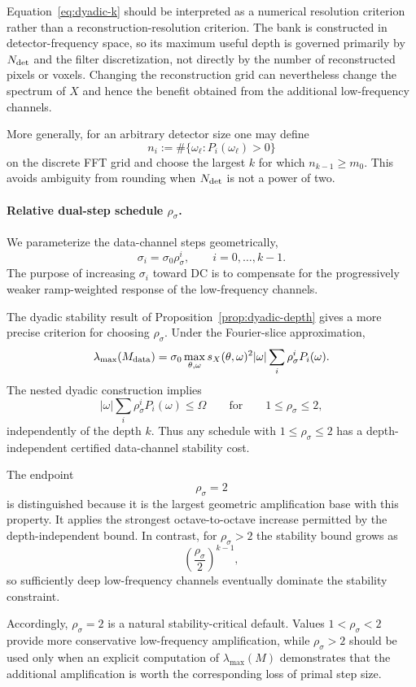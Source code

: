 \documentclass{article}
\begin{document}
Equation~\eqref{eq:dyadic-k} should be interpreted as a numerical
resolution criterion rather than a reconstruction-resolution
criterion.  The bank is constructed in detector-frequency space, so
its maximum useful depth is governed primarily by $N_{\rm det}$ and
the filter discretization, not directly by the number of reconstructed
pixels or voxels.  Changing the reconstruction grid can nevertheless
change the spectrum of $X$ and hence the benefit obtained from the
additional low-frequency channels.

More generally, for an arbitrary detector size one may define
\[
n_i
:=
\#\{\omega_\ell:P_i(\omega_\ell)>0\}
\]
on the discrete FFT grid and choose the largest $k$ for which
$n_{k-1}\ge m_0$.  This avoids ambiguity from rounding when
$N_{\rm det}$ is not a power of two.

\paragraph{Relative dual-step schedule $\rho_\sigma$.}
We parameterize the data-channel steps geometrically,
\begin{equation}
\label{eq:dyadic-step-schedule}
\sigma_i=\sigma_0\rho_\sigma^i,
\qquad i=0,\ldots,k-1.
\end{equation}
The purpose of increasing $\sigma_i$ toward DC is to compensate for
the progressively weaker ramp-weighted response of the low-frequency
channels.

The dyadic stability result of
Proposition~\ref{prop:dyadic-depth} gives a more precise criterion for
choosing $\rho_\sigma$.  Under the Fourier-slice approximation,
\[
\lambda_{\max}(M_{\rm data})
=
\sigma_0
\max_{\theta,\omega}
s_X(\theta,\omega)^2|\omega|
\sum_i\rho_\sigma^iP_i(\omega).
\]
The nested dyadic construction implies
\[
|\omega|
\sum_i\rho_\sigma^iP_i(\omega)
\le \Omega
\qquad\text{for}\qquad
1\le\rho_\sigma\le2,
\]
independently of the depth $k$.  Thus any schedule with
$1\le\rho_\sigma\le2$ has a depth-independent certified data-channel
stability cost.

The endpoint
\[
\boxed{\rho_\sigma=2}
\]
is distinguished because it is the largest geometric amplification
base with this property.  It applies the strongest octave-to-octave
increase permitted by the depth-independent bound.  In contrast, for
$\rho_\sigma>2$ the stability bound grows as
\[
\left(\frac{\rho_\sigma}{2}\right)^{k-1},
\]
so sufficiently deep low-frequency channels eventually dominate the
stability constraint.

Accordingly, $\rho_\sigma=2$ is a natural stability-critical default.
Values $1<\rho_\sigma<2$ provide more conservative low-frequency
amplification, while $\rho_\sigma>2$ should be used only when an
explicit computation of $\lambda_{\max}(M)$ demonstrates that the
additional amplification is worth the corresponding loss of primal
step size.
\end{document}
